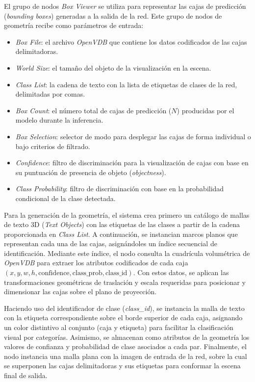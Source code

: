 El grupo de nodos \textit{Box Viewer} se utiliza para representar las cajas de predicción 
(\textit{bounding boxes}) generadas a la salida de la red. Este grupo de nodos de geometría 
recibe como parámetros de entrada:
\begin{itemize}
    \item \textit{Box File}: el archivo \textit{OpenVDB} que contiene los datos codificados de 
    las cajas delimitadoras.
    \item \textit{World Size}: el tamaño del objeto de la visualización en la escena.
    \item \textit{Class List}: la cadena de texto con la lista de etiquetas de clases de la red, 
    delimitadas por comas.
    \item \textit{Box Count}: el número total de cajas de predicción ($N$) producidas por el 
    modelo durante la inferencia.
    \item \textit{Box Selection}: selector de modo para desplegar las cajas de forma individual o 
    bajo criterios de filtrado.
    \item \textit{Confidence}: filtro de discriminación para la visualización de cajas con base en 
    su puntuación de presencia de objeto (\textit{objectness}).
    \item \textit{Class Probability}: filtro de discriminación con base en la probabilidad 
    condicional de la clase detectada.
\end{itemize}

Para la generación de la geometría, el sistema crea primero un catálogo de mallas de texto 3D 
(\textit{Text Objects}) con las etiquetas de las clases a partir de la cadena proporcionada en 
\textit{Class List}. A continuación, se instancian marcos planos que representan cada una de 
las cajas, asignándoles un índice secuencial de identificación. Mediante este índice, el nodo 
consulta la cuadrícula volumétrica de \textit{OpenVDB} para extraer los atributos codificados 
de cada caja $(x, y, w, h, \text{confidence}, \text{class\_prob}, \text{class\_id})$. Con estos 
datos, se aplican las transformaciones geométricas de traslación y escala requeridas para posicionar 
y dimensionar las cajas sobre el plano de proyección. 
\medskip

Haciendo uso del identificador de clase (\textit{class\_id}), se instancia la malla de texto con la 
etiqueta correspondiente sobre el borde superior de cada caja, asignando un color distintivo al 
conjunto (caja y etiqueta) para facilitar la clasificación visual por categorías. Asimismo, 
se almacenan como atributos de la geometría los valores de confianza y probabilidad de 
clase asociados a cada par. Finalmente, el nodo instancia una malla plana con la imagen de entrada 
de la red, sobre la cual se superponen las cajas delimitadoras y sus etiquetas para conformar la 
escena final de salida.
\medskip

